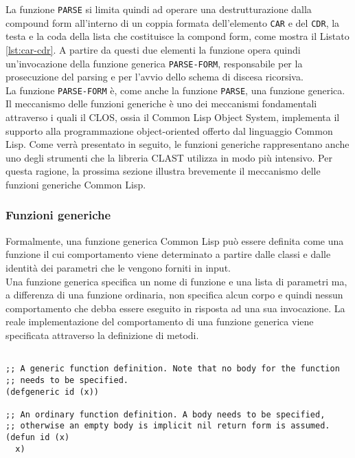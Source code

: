 La funzione \texttt{PARSE} si limita quindi ad operare una destrutturazione
dalla compound form all'interno di un coppia formata dell’elemento \texttt{CAR}
e del \texttt{CDR}, la testa e la coda della lista che costituisce la compond
form, come mostra il Listato \ref{lst:car-cdr}. A partire da questi due elementi
la funzione opera quindi un'invocazione della funzione generica
\texttt{PARSE-FORM}, responsabile per la prosecuzione del parsing e per l'avvio
dello schema di discesa ricorsiva.\\

La funzione \texttt{PARSE-FORM} è, come anche la funzione \texttt{PARSE}, una
funzione generica. Il meccanismo delle funzioni generiche è uno dei meccanismi
fondamentali attraverso i quali il CLOS, ossia il Common Lisp Object System,
implementa il supporto alla programmazione object-oriented offerto dal
linguaggio Common Lisp. Come verrà presentato in seguito, le funzioni generiche
rappresentano anche uno degli strumenti che la libreria CLAST utilizza in modo
più intensivo. Per questa ragione, la prossima sezione illustra brevemente il
meccanismo delle funzioni generiche Common Lisp.

\subsubsection{Funzioni generiche}
\label{generic-functions}

Formalmente, una funzione generica Common Lisp può essere definita come una
funzione il cui comportamento viene determinato a partire dalle classi e dalle
identità dei parametri che le vengono forniti in input.\\

Una funzione generica specifica un nome di funzione e una lista di parametri ma,
a differenza di una funzione ordinaria, non specifica alcun corpo e quindi
nessun comportamento che debba essere eseguito in risposta ad una sua
invocazione. La reale implementazione del comportamento di una funzione generica
viene specificata attraverso la definizione di metodi.

\begin{lstlisting}[caption=Confronto tra definizione di funzioni generiche e
ordinarie]

;; A generic function definition. Note that no body for the function
;; needs to be specified.
(defgeneric id (x))

;; An ordinary function definition. A body needs to be specified,
;; otherwise an empty body is implicit nil return form is assumed.
(defun id (x)
  x)

\end{lstlisting}

